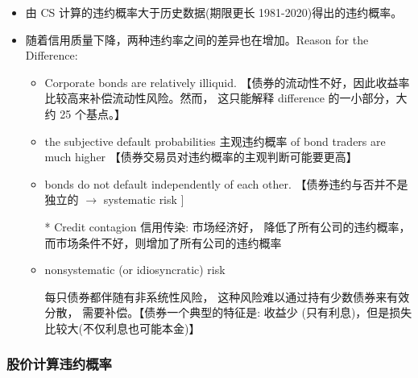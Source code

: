 \begin{itemize}
\item 由 CS 计算的违约概率大于历史数据(期限更长 1981-2020)得出的违约概率。

\item 随着信用质量下降，两种违约率之间的差异也在增加。Reason for the Difference:
\begin{itemize}

\item Corporate bonds are relatively illiquid. 【债券的流动性不好，因此收益率比较高来补偿流动性风险。然而， 这只能解释 difference 的一小部分，大约 25 个基点。】

\item the subjective default probabilities 主观违约概率 of bond traders are much higher 【债券交易员对违约概率的主观判断可能要更高】

\item bonds do not default independently of each other. 【债券违约与否并不是独立的 \(\rightarrow\) systematic risk \(\rbrack\)

* Credit contagion 信用传染: 市场经济好， 降低了所有公司的违约概率，而市场条件不好，则增加了所有公司的违约概率

\item nonsystematic (or idiosyncratic) risk

每只债券都伴随有非系统性风险， 这种风险难以通过持有少数债券来有效分散， 需要补偿。【债券一个典型的特征是: 收益少 (只有利息)，但是损失比较大(不仅利息也可能本金)】


\end{itemize}

\end{itemize}


\subsubsection{股价计算违约概率}

